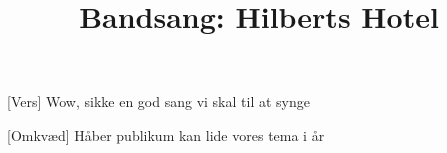 \documentclass[a4paper,11pt]{article}
\title{Bandsang: Hilberts Hotel}
\begin{document}
\maketitle

\begin{song}
[Vers] Wow, sikke en god sang vi skal til at synge

[Omkvæd] Håber publikum kan lide vores tema i år
\end{song}
\end{document}
